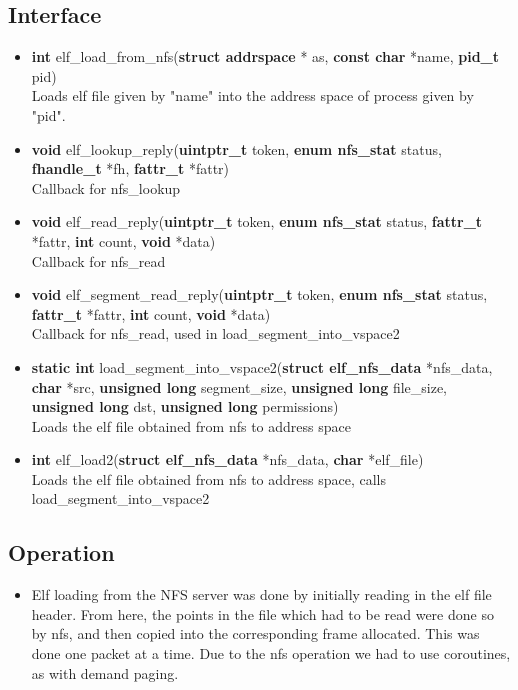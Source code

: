 \documentclass[12pt]{article}
\begin{document}
\subsection{Interface}
\begin{itemize}
\item \textbf{int} elf\_load\_from\_nfs(\textbf{struct addrspace} * as, \textbf{const char} *name, \textbf{pid\_t} pid)\\
Loads elf file given by "name" into the address space of process given by "pid".
\item \textbf{void} elf\_lookup\_reply(\textbf{uintptr\_t} token, \textbf{enum nfs\_stat} status, \textbf{fhandle\_t} *fh, \textbf{fattr\_t} *fattr)\\
Callback for nfs\_lookup
\item \textbf{void} elf\_read\_reply(\textbf{uintptr\_t} token, \textbf{enum nfs\_stat} status, \textbf{fattr\_t} *fattr, \textbf{int} count, \textbf{void} *data)\\
Callback for nfs\_read 
\item \textbf{void} elf\_segment\_read\_reply(\textbf{uintptr\_t} token, \textbf{enum nfs\_stat} status, \textbf{fattr\_t} *fattr, \textbf{int} count, \textbf{void} *data)\\
Callback for nfs\_read, used in load\_segment\_into\_vspace2
\item \textbf{static int} load\_segment\_into\_vspace2(\textbf{struct elf\_nfs\_data} *nfs\_data, \textbf{char} *src, \textbf{unsigned long} segment\_size, \textbf{unsigned long} file\_size, \textbf{unsigned long} dst, \textbf{unsigned long} permissions)\\
Loads the elf file obtained from nfs to address space
\item \textbf{int} elf\_load2(\textbf{struct elf\_nfs\_data} *nfs\_data, \textbf{char} *elf\_file)\\
Loads the elf file obtained from nfs to address space, calls load\_segment\_into\_vspace2

\end{itemize}
\subsection{Operation}
\begin{itemize}
\item Elf loading from the NFS server was done by initially reading in the elf file header. From here, the points in the file which had to be read were done so by nfs, and then copied into the corresponding frame allocated. This was done one packet at a time. Due to the nfs operation we had to use coroutines, as with demand paging.
\end{itemize}
\end{document}
